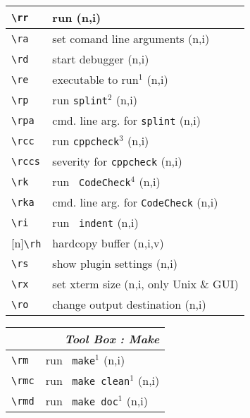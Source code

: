 \documentclass[oneside,11pt,landscape,DIV16]{scrartcl}
\newcommand{\Rep}{{\tiny{[n]}}}
\begin{document}
\begin{multicols}{3}
\begin{center}
\begin{tabular}[]{|p{12mm}|p{58mm}|}
\hline \verb'\rr'  & run                                     \hfill (n,i)\\
\hline \verb'\ra'  & set comand line arguments               \hfill (n,i)\\
\hline \verb'\rd'  & start debugger                          \hfill (n,i)\\
\hline \verb'\re'  & executable to run$^1$                   \hfill (n,i)\\
%
\hline \verb'\rp'  & run \texttt{splint}$^2$                 \hfill (n,i)\\
\hline \verb'\rpa' & cmd. line arg. for \texttt{splint}      \hfill (n,i)\\
%
\hline \verb'\rcc' & run \texttt{cppcheck}$^3$               \hfill (n,i)\\
\hline \verb'\rccs'& severity for \texttt{cppcheck}          \hfill (n,i)\\
%
\hline \verb'\rk'  & run \texttt{ CodeCheck}$^4$             \hfill (n,i)\\
\hline \verb'\rka' & cmd. line arg. for \texttt{CodeCheck}   \hfill (n,i)\\
%
\hline \verb'\ri'  & run \texttt{ indent}        \hfill (n,i)\\
\hline \Rep\verb'\rh'  & hardcopy buffer         \hfill (n,i,v)\\
\hline \verb'\rs'  & show plugin settings        \hfill (n,i)\\
\hline \verb'\rx'  & set xterm size              \hfill (n,i, only Unix \& GUI)\\
\hline \verb'\ro'  & change output destination   \hfill (n,i)\\
\hline 
\end{tabular}
%
%
\begin{tabular}[]{|p{12mm}|p{58mm}|}
\hline
\multicolumn{2}{|r|}{\textsl{Tool Box : \textbf{M}ake}} \\
\hline \verb'\rm'  & run \texttt{ make}$^1$                  \hfill (n,i)\\
\hline \verb'\rmc' & run \texttt{ make clean}$^1$            \hfill (n,i)\\
\hline \verb'\rmd' & run \texttt{ make doc}$^1$              \hfill (n,i)\\

\end{tabular}
\end{center}
\end{multicols}
\end{document}

